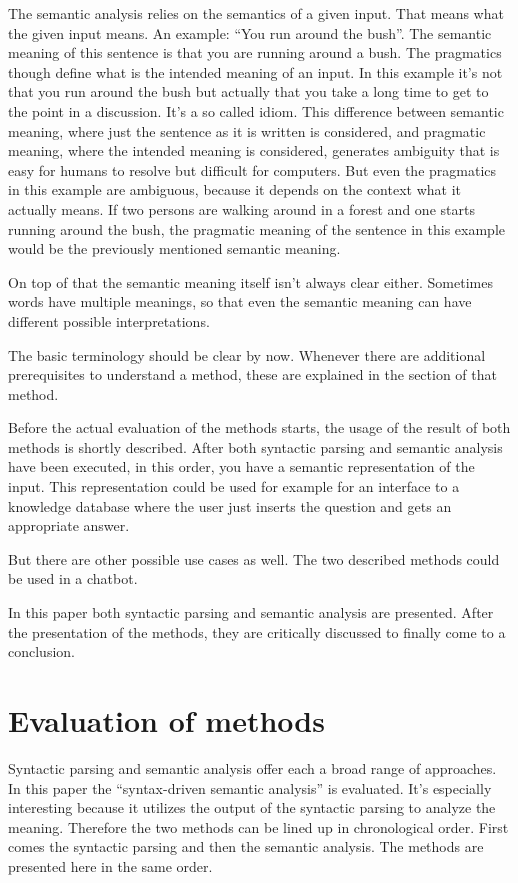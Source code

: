 \documentclass[12pt,twoside]{scrartcl}
\theoremstyle{plain}
\theoremstyle{definition}
\theoremstyle{remark}
\begin{document}
	The semantic analysis relies on the semantics of a given input. That means what the given input means. An example: ``You run around the bush''. The semantic meaning of this sentence is that you are running around a bush. 
	The pragmatics though define what is the intended meaning of an input. In this example it's not that you run around the bush but actually that you take a long time to get to the point in a discussion. It's a so called idiom. This difference between semantic meaning, where just the sentence as it is written is considered, and pragmatic meaning, where the intended meaning is considered, generates ambiguity that is easy for humans to resolve but difficult for computers. But even the pragmatics in this example are ambiguous, because it depends on the context what it actually means. If two persons are walking around in a forest and one starts running around the bush, the pragmatic meaning of the sentence in this example would be the previously mentioned semantic meaning.
	
	On top of that the semantic meaning itself isn't always clear either. Sometimes words have multiple meanings, so that even the semantic meaning can have different possible interpretations.
	
	The basic terminology should be clear by now. Whenever there are additional prerequisites to understand a method, these are explained in the section of that method.
	
	Before the actual evaluation of the methods starts, the usage of the result of both methods is shortly described. After both syntactic parsing and semantic analysis have been executed, in this order, you have a semantic representation of the input. This representation could be used for example for an interface to a knowledge database where the user just inserts the question and gets an appropriate answer.
	
	But there are other possible use cases as well. The two described methods could be used in a chatbot.
	
	In this paper both syntactic parsing and semantic analysis are presented. After the presentation of the methods, they are critically discussed to finally come to a conclusion.

\section{Evaluation of methods}
\label{sec:evalMethods}
	
	Syntactic parsing and semantic analysis offer each a broad range of approaches. In this paper the ``syntax-driven semantic analysis''\cite[p.~617]{Jurafsky2009} is evaluated. It's especially interesting because it utilizes the output of the syntactic parsing to analyze the meaning. Therefore the two methods can be lined up in chronological order. First comes the syntactic parsing and then the semantic analysis. The methods are presented here in the same order. 
	
\end{document}
